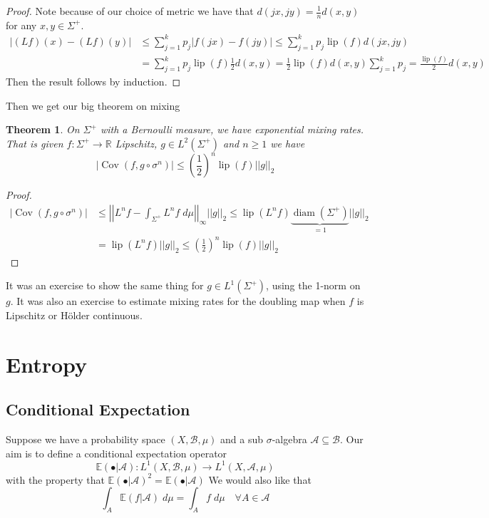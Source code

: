 \documentclass[11pt]{article}
\newcommand{\abs}[1]{\left|#1\right|}
\newcommand{\norm}[1]{\left|\left|#1\right|\right|}
\newcommand{\R}{\mathbb{R}}
\DeclareMathOperator{\Cov}{\mathrm{Cov}}
\DeclareMathOperator{\lip}{\mathrm{lip}}
\DeclareMathOperator{\diam}{\mathrm{diam}}
\newcommand{\dm}{\;d\mu}
\newtheorem{theorem}[prop]{Theorem}
\begin{document}
\begin{proof}
Note because of our choice of metric we have that $d(jx, jy) = \frac{1}{n}d(x, y)$ for any $x, y\in\Sigma^+$.
\begin{align*}
	\abs{(Lf)(x)-(Lf)(y)} & \leq \sum_{j=1}^{k}p_j \abs{f(jx) - f(jy)} \leq \sum_{j=1}^{k} p_j \lip(f) d(jx, jy) \\
						  & = \sum_{j=1}^{k} p_j \lip(f) \frac{1}{2}d(x, y) = \frac{1}{2}\lip(f) d(x, y) \sum_{j=1}^{k}p_j = \frac{\lip(f)}{2}d(x,y)
\end{align*}
Then the result follows by induction.
\end{proof}

Then we get our big theorem on mixing

\begin{theorem}
On $\Sigma^+$ with a Bernoulli measure, we have exponential mixing rates.
That is given $f:\Sigma^+ \to \R$ Lipschitz, $g\in L^2(\Sigma^+)$ and $n\geq 1$ we have
\[
	\abs{\Cov(f, g \circ \sigma^n)} \leq \left( \frac{1}{2}\right)^n \lip(f) \norm{g}_2
\]
\end{theorem}

\begin{proof}
\begin{align*}
	\abs{\Cov(f, g \circ \sigma^n)} &\leq \norm{L^nf - \int_{\Sigma^+}L^nf \dm}_\infty \norm{g}_2 \leq \lip(L^nf)\underbrace{\diam(\Sigma^+)}_{=1}\norm{g}_2 \\
									&= \lip(L^n f) \norm{g}_2 \leq \left( \frac{1}{2}\right)^n\lip(f) \norm{g}_2
\end{align*}
\end{proof}

It was an exercise to show the same thing for $g\in L^1(\Sigma^+)$, using the 1-norm on $g$.
It was also an exercise to estimate mixing rates for the doubling map when $f$ is Lipschitz or H\"older continuous.

\section{Entropy}

\subsection{Conditional Expectation}
Suppose we have a probability space $(X, \mathcal{B}, \mu)$ and a sub $\sigma$-algebra $\mathcal{A} \subseteq \mathcal{B}$.
Our aim is to define a conditional expectation operator
\[
	\mathbb{E}(\bullet | \mathcal{A}) : L^1(X, \mathcal{B}, \mu) \to L^1(X, \mathcal{A}, \mu)
\]
with the property that $\mathbb{E}(\bullet | \mathcal{A})^2=\mathbb{E}(\bullet | \mathcal{A})$
We would also like that
\[
	\int_A \mathbb{E}(f | \mathcal{A}) \dm = \int_A f \dm \quad \forall A \in \mathcal{A}
\]
\end{document}
